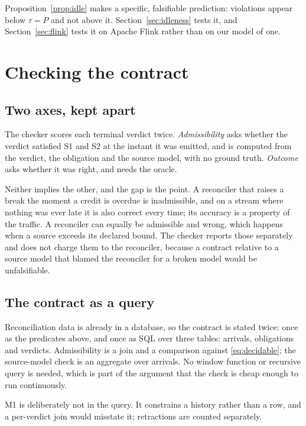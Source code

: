 \documentclass[10pt,conference]{IEEEtran}
\begin{document}
Proposition~\ref{prop:idle} makes a specific, falsifiable prediction: violations
appear below $\tau = P$ and not above it. Section~\ref{sec:idleness} tests it,
and Section~\ref{sec:flink} tests it on Apache Flink rather than on our model
of one.

\section{Checking the contract}

\subsection{Two axes, kept apart}

The checker scores each terminal verdict twice. \emph{Admissibility} asks
whether the verdict satisfied S1 and S2 at the instant it was emitted, and is computed from the verdict, the obligation and the source model, with no
ground truth. \emph{Outcome} asks whether it was right, and needs the oracle.

Neither implies the other, and the gap is the point. A reconciler that raises a
break the moment a credit is overdue is inadmissible, and on a stream where
nothing was ever late it is also correct every time; its accuracy is a property
of the traffic. A reconciler can equally be admissible and wrong, which happens
when a source exceeds its declared bound. The checker reports those separately
and does not charge them to the reconciler, because a contract relative to a
source model that blamed the reconciler for a broken model would be
unfalsifiable.

\subsection{The contract as a query}
\label{sec:sql}

Reconciliation data is already in a database, so the contract is stated twice:
once as the predicates above, and once as SQL over three tables: arrivals, obligations and verdicts. Admissibility is a join and a comparison against
\eqref{eq:decidable}; the source-model check is an aggregate over arrivals. No
window function or recursive query is needed, which is part of the argument that
the check is cheap enough to run continuously.

M1 is deliberately not in the query. It constrains a history rather than a row,
and a per-verdict join would misstate it; retractions are counted separately.
\end{document}
